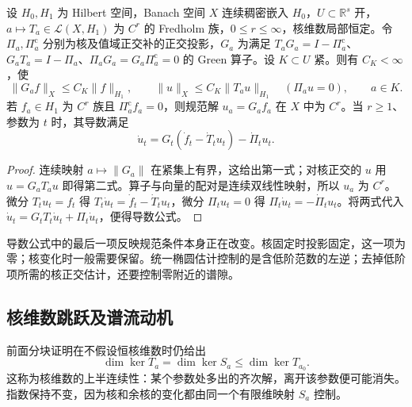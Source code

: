 \begin{corollary}\label{g3:cor:uniform-parameter-green}
	设 \(H_0,H_1\) 为 Hilbert 空间，Banach 空间 \(X\) 连续稠密嵌入 \(H_0\)，\(U\subset\mathbb R^s\) 开，\(a\mapsto T_a\in\mathcal L(X,H_1)\) 为 \(C^r\) 的 Fredholm 族，\(0\le r\le\infty\)，核维数局部恒定。令 \(\Pi_a,\Pi_a^{\mathrm c}\) 分别为核及值域正交补的正交投影，\(G_a\) 为满足 \(T_aG_a=I-\Pi_a^{\mathrm c}\)、\(G_aT_a=I-\Pi_a\)、\(\Pi_aG_a=G_a\Pi_a^{\mathrm c}=0\) 的 Green 算子。设 \(K\subset U\) 紧。则有 \(C_K<\infty\)，使
	\[
		\|G_af\|_X\le C_K\|f\|_{H_1},\qquad
		\|u\|_X\le C_K\|T_au\|_{H_1}\quad(\Pi_au=0),\qquad a\in K.
	\]
	若 \(f_a\in H_1\) 为 \(C^r\) 族且 \(\Pi_a^{\mathrm c}f_a=0\)，则规范解 \(u_a=G_af_a\) 在 \(X\) 中为 \(C^r\)。当 \(r\ge1\)、参数为 \(t\) 时，其导数满足
	\begin{equation}\label{g3:eq:normalized-solution-derivative}
		\dot u_t=G_t(\dot f_t-\dot T_tu_t)-\dot\Pi_tu_t.
	\end{equation}
\end{corollary}
\begin{proof}
	连续映射 \(a\mapsto\|G_a\|\) 在紧集上有界，这给出第一式；对核正交的 \(u\) 用 \(u=G_aT_au\) 即得第二式。算子与向量的配对是连续双线性映射，所以 \(u_a\) 为 \(C^r\)。微分 \(T_tu_t=f_t\) 得
	\(T_t\dot u_t=\dot f_t-\dot T_tu_t\)，微分 \(\Pi_tu_t=0\) 得
	\(\Pi_t\dot u_t=-\dot\Pi_tu_t\)。将两式代入
	\(\dot u_t=G_tT_t\dot u_t+\Pi_t\dot u_t\)，便得导数公式。
\end{proof}

导数公式中的最后一项反映规范条件本身正在改变。核固定时投影固定，这一项为零；核变化时一般需要保留。统一椭圆估计控制的是含低阶范数的左逆；去掉低阶项所需的核正交估计，还要控制零附近的谱隙。

\subsection{核维数跳跃及谱流动机}
\label{g3:subsec:1404:03}
前面分块证明在不假设恒核维数时仍给出
\[
	\dim\ker T_a=\dim\ker S_a\le\dim\ker T_{a_0}.
\]
这称为核维数的上半连续性：某个参数处多出的齐次解，离开该参数便可能消失。指数保持不变，因为核和余核的变化都由同一个有限维映射 \(S_a\) 控制。

